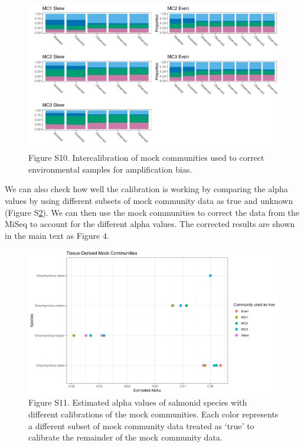 \documentclass[
]{article}
\begin{document}
\begin{figure}
\centering
\includegraphics{../Output/SupplementalFigures/mock_internal_calibration.png}
\caption{Figure S10. Intercalibration of mock communities used to
correct environmental samples for amplification
bias.\label{fig:intercal}}
\end{figure}

We can also check how well the calibration is working by comparing the
alpha values by using different subsets of mock community data as true
and unknown (Figure S\ref{fig:alphas}). We can then use the mock
communities to correct the data from the MiSeq to account for the
different alpha values. The corrected results are shown in the main text
as Figure 4.

\begin{figure}
\centering
\includegraphics{../Output/SupplementalFigures/mock_internal_calibration_compare_alphas.png}
\caption{Figure S11. Estimated alpha values of salmonid species with
different calibrations of the mock communities. Each color represents a
different subset of mock community data treated as `true' to calibrate
the remainder of the mock community data.\label{fig:alphas}}
\end{figure}
\end{document}

